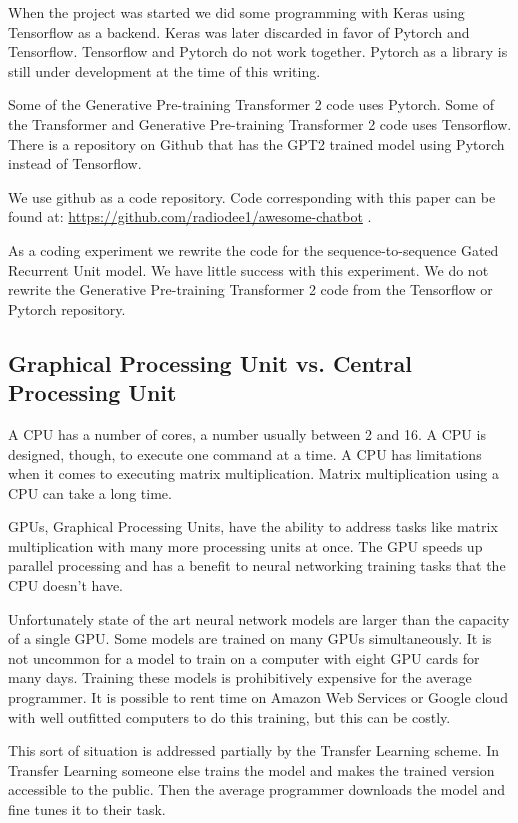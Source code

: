 When the project was started we did some programming with Keras using Tensorflow as a backend. Keras was later discarded in favor of Pytorch and Tensorflow. Tensorflow and Pytorch do not work together. Pytorch as a library is still under development at the time of this writing.

Some of the Generative Pre-training Transformer 2 code uses Pytorch. Some of the Transformer and Generative Pre-training Transformer 2 code uses Tensorflow. There is a repository on Github that has the GPT2 trained model using Pytorch instead of Tensorflow.

We use github as a code repository. Code corresponding with this paper can be found at: \href{https://github.com/radiodee1/awesome-chatbot}{https://github.com/radiodee1/awesome-chatbot} . 

As a coding experiment we rewrite the code for the sequence-to-sequence Gated Recurrent Unit model. We have little success with this experiment. We do not rewrite the Generative Pre-training Transformer 2 code from the Tensorflow or Pytorch repository.





\subsection{Graphical Processing Unit vs. Central Processing Unit}

A CPU has a number of cores, a number usually between 2 and 16. A CPU is designed, though, to execute one command at a time. A CPU has limitations when it comes to executing matrix multiplication. Matrix multiplication using a CPU can take a long time.

GPUs, Graphical Processing Units, have the ability to address tasks like matrix multiplication with many more processing units at once. The GPU speeds up parallel processing and has a benefit to neural networking training tasks that the CPU doesn't have.

Unfortunately state of the art neural network models are larger than the capacity of a single GPU. Some models are trained on many GPUs simultaneously. It is not uncommon for a model to train on a computer with eight GPU cards for many days. Training these models is prohibitively expensive for the average programmer. It is possible to rent time on Amazon Web Services or Google cloud with well outfitted computers to do this training, but this can be costly.

This sort of situation is addressed partially by the Transfer Learning scheme. In Transfer Learning someone else trains the model and makes the trained version accessible to the public. Then the average programmer downloads the model and fine tunes it to their task.

